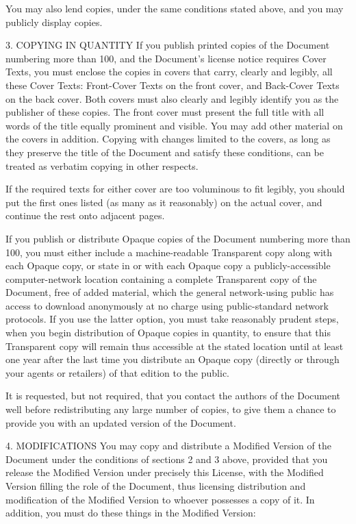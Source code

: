 You may also lend copies, under the same conditions stated above, and you may publicly display copies.

3. COPYING IN QUANTITY
If you publish printed copies of the Document numbering more than 100, and the Document's license notice requires Cover Texts, you must enclose the copies in covers that carry, clearly and legibly, all these Cover Texts: Front-Cover Texts on the front cover, and Back-Cover Texts on the back cover. Both covers must also clearly and legibly identify you as the publisher of these copies. The front cover must present the full title with all words of the title equally prominent and visible. You may add other material on the covers in addition. Copying with changes limited to the covers, as long as they preserve the title of the Document and satisfy these conditions, can be treated as verbatim copying in other respects.

If the required texts for either cover are too voluminous to fit legibly, you should put the first ones listed (as many as it reasonably) on the actual cover, and continue the rest onto adjacent pages. 

If you publish or distribute Opaque copies of the Document numbering more than 100, you must either include a machine-readable Transparent copy along with each Opaque copy, or state in or with each Opaque copy a publicly-accessible computer-network location containing a complete Transparent copy of the Document, free of added material, which the general network-using public has access to download anonymously at no charge using public-standard network protocols. If you use the latter option, you must take reasonably prudent steps, when you begin distribution of Opaque copies in quantity, to ensure that this Transparent copy will remain thus accessible at the stated location until at least one year after the last time you distribute an Opaque copy (directly or through your agents or retailers) of that edition to the public.

It is requested, but not required, that you contact the authors of the Document well before redistributing any large number of copies, to give them a chance to provide you with an updated version of the Document.

4. MODIFICATIONS
You may copy and distribute a Modified Version of the Document under the conditions of sections 2 and 3 above, provided that you release the Modified Version under precisely this License, with the Modified Version filling the role of the Document, thus licensing distribution and modification of the Modified Version to whoever possesses a copy of it. In addition, you must do these things in the Modified Version:

